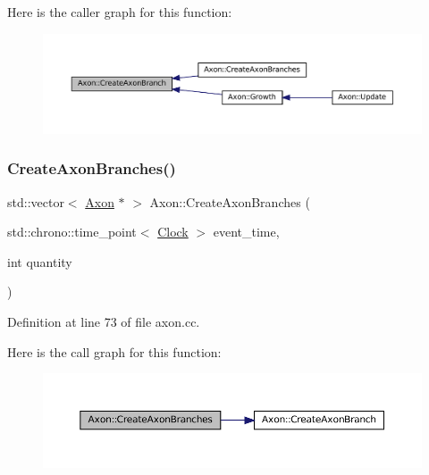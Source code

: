 Here is the caller graph for this function\+:\nopagebreak
\begin{figure}[H]
\begin{center}
\leavevmode
\includegraphics[width=350pt]{class_axon_a41e97ead4c793003db2de87061574c26_icgraph}
\end{center}
\end{figure}
\mbox{\label{class_axon_ab0da51c05a0879efdb45c594b68ef8fd}} 
\subsubsection{\texorpdfstring{Create\+Axon\+Branches()}{CreateAxonBranches()}}
{\footnotesize\ttfamily std\+::vector$<$ \mbox{\hyperlink{class_axon}{Axon}} $\ast$ $>$ Axon\+::\+Create\+Axon\+Branches (\begin{DoxyParamCaption}\item[{std\+::chrono\+::time\+\_\+point$<$ \mbox{\hyperlink{universe_8h_a0ef8d951d1ca5ab3cfaf7ab4c7a6fd80}{Clock}} $>$}]{event\+\_\+time,  }\item[{int}]{quantity }\end{DoxyParamCaption})}



Definition at line 73 of file axon.\+cc.

Here is the call graph for this function\+:\nopagebreak
\begin{figure}[H]
\begin{center}
\leavevmode
\includegraphics[width=350pt]{class_axon_ab0da51c05a0879efdb45c594b68ef8fd_cgraph}
\end{center}
\end{figure}
\mbox{\label{class_axon_a6ac580e4565d24c955b0a48d7a8b20e2}} 
